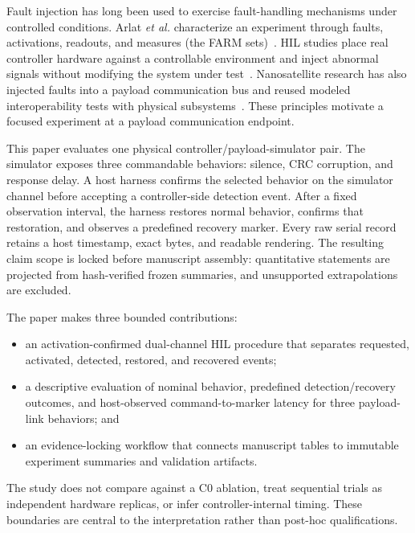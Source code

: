 \documentclass[conference]{IEEEtran}
\begin{document}
Fault injection has long been used to exercise fault-handling mechanisms under controlled conditions. Arlat \emph{et al.} characterize an experiment through faults, activations, readouts, and measures (the FARM sets)~\cite{arlat1990}. HIL studies place real controller hardware against a controllable environment and inject abnormal signals without modifying the system under test~\cite{abboush2022,abboush2024}. Nanosatellite research has also injected faults into a payload communication bus and reused modeled interoperability tests with physical subsystems~\cite{batista2019,conceicao2025}. These principles motivate a focused experiment at a payload communication endpoint.

This paper evaluates one physical controller/payload-simulator pair. The simulator exposes three commandable behaviors: silence, CRC corruption, and response delay. A host harness confirms the selected behavior on the simulator channel before accepting a controller-side detection event. After a fixed observation interval, the harness restores normal behavior, confirms that restoration, and observes a predefined recovery marker. Every raw serial record retains a host timestamp, exact bytes, and readable rendering. The resulting claim scope is locked before manuscript assembly: quantitative statements are projected from hash-verified frozen summaries, and unsupported extrapolations are excluded.

The paper makes three bounded contributions:

\begin{itemize}
  \item an activation-confirmed dual-channel HIL procedure that separates requested, activated, detected, restored, and recovered events;
  \item a descriptive evaluation of nominal behavior, predefined detection/recovery outcomes, and host-observed command-to-marker latency for three payload-link behaviors; and
  \item an evidence-locking workflow that connects manuscript tables to immutable experiment summaries and validation artifacts.
\end{itemize}

The study does not compare against a C0 ablation, treat sequential trials as independent hardware replicas, or infer controller-internal timing. These boundaries are central to the interpretation rather than post-hoc qualifications.
\end{document}
